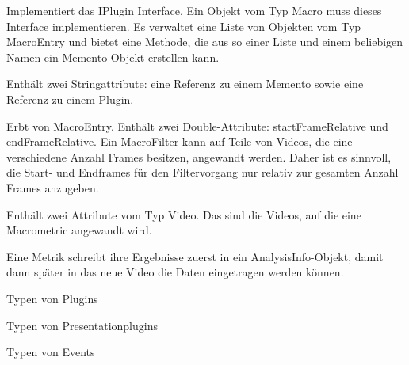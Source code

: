 Implementiert das IPlugin Interface. Ein Objekt vom Typ Macro muss dieses Interface implementieren. Es verwaltet eine Liste von Objekten vom Typ MacroEntry und bietet eine Methode, die aus so einer Liste und einem beliebigen Namen ein Memento-Objekt erstellen kann.


Enthält zwei Stringattribute: eine Referenz zu einem Memento sowie eine Referenz zu einem Plugin.


Erbt von MacroEntry. Enthält zwei Double-Attribute: startFrameRelative und endFrameRelative. Ein MacroFilter kann auf Teile von Videos, die eine verschiedene Anzahl Frames besitzen, angewandt werden. Daher ist es sinnvoll, die Start- und Endframes für den Filtervorgang nur relativ zur gesamten Anzahl Frames anzugeben.


Enthält zwei Attribute vom Typ Video. Das sind die Videos, auf die eine Macrometric angewandt wird.

Eine Metrik schreibt ihre Ergebnisse zuerst in ein AnalysisInfo-Objekt, damit dann später in das neue Video die Daten eingetragen werden können.


Typen von Plugins


Typen von Presentationplugins


Typen von Events
